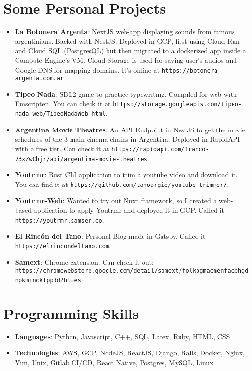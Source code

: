 \documentclass[letterpaper,11pt]{article}
\newcommand{\resumeItem}[2]{
  \item\small{
    \textbf{#1}{: #2 \vspace{-2pt}}
  }
}
\newcommand{\resumeSubItem}[2]{\resumeItem{#1}{#2}\vspace{-4pt}}
\newcommand{\resumeSubHeadingListStart}{\begin{itemize}[leftmargin=*]}
\newcommand{\resumeSubHeadingListEnd}{\end{itemize}}
\begin{document}
\section{Some Personal Projects}
 \resumeSubHeadingListStart
   \resumeSubItem{La Botonera Argenta}
     {NextJS web-app displaying sounds from famous argentinians. Backed with NestJS. Deployed in GCP, first using Cloud Run and Cloud SQL (PostgresQL) but then migrated to a dockerized app inside a Compute Engine's VM. Cloud Storage is used for saving user's audios and Google DNS for mapping domains. It's online at \nolinkurl{https://botonera-argenta.com.ar}}
   \resumeSubItem{Tipeo Nada}
     {SDL2 game to practice typewriting. Compiled for web with Emscripten. You can check it at \nolinkurl{https://storage.googleapis.com/tipeo-nada-web/TipeoNadaWeb.html}.}
   \resumeSubItem{Argentina Movie Theatres}
     {An API Endpoint in NestJS to get the movie schedules of the 3 main cinema chains in Argentina. Deployed in RapidAPI with a free tier. Can check it at \nolinkurl{https://rapidapi.com/franco-73xZwCbjr/api/argentina-movie-theatres}.}
   \resumeSubItem{Youtrmr}
     {Rust CLI application to trim a youtube video and download it. You can find it at \nolinkurl{https://github.com/tanoargie/youtube-trimmer/}.}
   \resumeSubItem{Youtrmr-Web}
     {Wanted to try out Nuxt framework, so I created a web-based application to apply Youtrmr and deployed it in GCP. Called it \nolinkurl{https://youtrmr.samser.co}.}
   \resumeSubItem{El Rincón del Tano}
     {Personal Blog made in Gatsby. Called it \nolinkurl{https://elrincondeltano.com}.}
   \resumeSubItem{Samext}
     {Chrome extension. Can check it out: \nolinkurl{https://chromewebstore.google.com/detail/samext/folkogmaemenfaebhgdnpkminckfppdd?hl=es}.}
 \resumeSubHeadingListEnd


\section{Programming Skills}
  \resumeSubHeadingListStart
    \item{
      \textbf{Languages}{: Python, Javascript, C++, SQL, Latex, Ruby, HTML, CSS}
    }
    \item{
      \textbf{Technologies}{: AWS, GCP, NodeJS, ReactJS, Django, Rails, Docker, Nginx, Vim, Unix, Gitlab CI/CD, React Native, Postgres, MySQL, Linux}
    }
  \resumeSubHeadingListEnd


\end{document}
